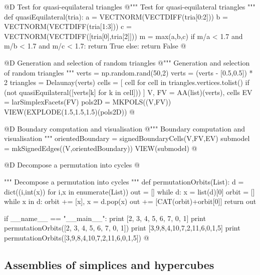 \documentclass[11pt,oneside]{article}    %
\begin{document}
@D Test for quasi-equilateral triangles
@{""" Test for quasi-equilateral triangles """
def quasiEquilateral(tria):
    a = VECTNORM(VECTDIFF(tria[0:2]))
    b = VECTNORM(VECTDIFF(tria[1:3]))
    c = VECTNORM(VECTDIFF([tria[0],tria[2]]))
    m = max(a,b,c)
    if m/a < 1.7 and m/b < 1.7 and m/c < 1.7: return True
    else: return False
@}

@D Generation and selection of random triangles 
@{""" Generation and selection of random triangles """
verts = np.random.rand(50,2)
verts = (verts - [0.5,0.5]) * 2
triangles = Delaunay(verts)
cells = [ cell for cell in triangles.vertices.tolist()
         if (not quasiEquilateral([verts[k] for k in cell])) ]
V, FV = AA(list)(verts), cells
EV = larSimplexFacets(FV)
pols2D = MKPOLS((V,FV))
VIEW(EXPLODE(1.5,1.5,1.5)(pols2D))
@}

@D Boundary computation and visualisation 
@{""" Boundary computation and visualisation """
orientedBoundary = signedBoundaryCells(V,FV,EV)
submodel = mkSignedEdges((V,orientedBoundary))
VIEW(submodel)
@}


@D Decompose a permutation into cycles 
@{""" Decompose a permutation into cycles """
def permutationOrbits(List):
    d = dict((i,int(x)) for i,x in enumerate(List))
    out = []
    while d:
        x = list(d)[0]
        orbit = []
        while x in d:
            orbit += [x],
            x = d.pop(x)
        out += [CAT(orbit)+orbit[0]]
    return out
        
if __name__ == "__main__":
    print [2, 3, 4, 5, 6, 7, 0, 1]
    print permutationOrbits([2, 3, 4, 5, 6, 7, 0, 1])
    print [3,9,8,4,10,7,2,11,6,0,1,5]
    print permutationOrbits([3,9,8,4,10,7,2,11,6,0,1,5])
@}

\subsection{Assemblies of simplices and hypercubes}
\end{document}
